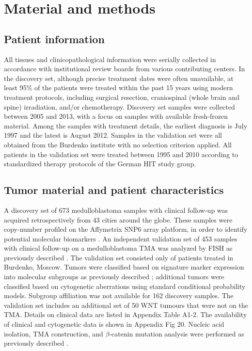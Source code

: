 \clearpage

\section{Material and methods}

\subsection{Patient information}

All tissues and clinicopathological information were serially collected in accordance with institutional review boards from various contributing centers. In the discovery set, although precise treatment dates were often unavailable, at least 95\% of the patients were treated within the past 15 years using modern treatment protocols, including surgical resection, craniospinal (whole brain and spine) irradiation, and/or chemotherapy. Discovery set samples were collected between 2005 and 2013, with a focus on samples with available fresh-frozen material. Among the samples with treatment details, the earliest diagnosis is July 1997 and the latest is August 2012. Samples in the validation set were all obtained from the Burdenko institute with no selection criterion applied. All patients in the validation set were treated between 1995 and 2010 according to standardized therapy protocols of the German HIT study group.

\subsection{Tumor material and patient characteristics}

A discovery set of 673 medulloblastoma samples with clinical follow-up was acquired retrospectively from 43 cities around the globe. These samples were copy-number profiled on the Affymetrix SNP6 array platform, in order to identify potential molecular biomarkers . An independent validation set of 453 samples with clinical follow-up on a medulloblastoma TMA was analyzed by FISH as previously described . The validation set consisted only of patients treated in Burdenko, Moscow. Tumors were classified based on signature marker expression into molecular subgroups as previously described ; additional tumors were classified based on cytogenetic aberrations using standard conditional probability models. Subgroup affiliation was not available for 162 discovery samples. The validation set includes an additional set of 50 WNT tumours that were not on the TMA. Details on clinical data are listed in Appendix Table A1-2. The availability of clinical and cytogenetic data is shown in Appendix Fig 20. Nucleic acid isolation, TMA construction, and $\beta$-catenin mutation analysis were performed as previously described . 

